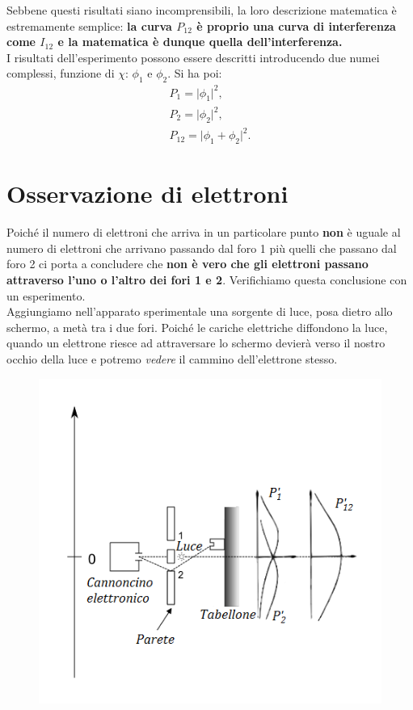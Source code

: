 Sebbene questi risultati siano incomprensibili, la loro descrizione matematica è estremamente semplice: \textbf{la curva $P_{12}$ è proprio una curva di interferenza come $I_{12}$ e la matematica è dunque quella dell'interferenza.}\\
I risultati dell'esperimento possono essere descritti introducendo due numei complessi, funzione di $\chi$: $\phi _1$ e $\phi _2$. Si ha poi:
\begin{eqnarray}
& P_1= \lvert \phi _1 \rvert ^2, & \\
& P_2= \lvert \phi _2 \rvert ^2, &\\
& P_{12}= \lvert \phi _1 + \phi _2 \rvert ^2. 
\end{eqnarray}
\section*{Osservazione di elettroni}
Poiché il numero di elettroni che arriva in un particolare punto \textbf{non} è uguale al numero di elettroni che arrivano passando dal foro 1 più quelli che passano dal foro 2 ci porta a concludere che \textbf{non è vero che gli elettroni passano attraverso l'uno o l'altro dei fori 1 e 2}. Verifichiamo questa conclusione con un esperimento.\\
Aggiungiamo nell'apparato sperimentale una sorgente di luce, posa dietro allo schermo, a metà tra i due fori. Poiché le cariche elettriche diffondono la luce, quando un elettrone riesce ad attraversare lo schermo devierà verso il nostro occhio della luce e potremo \textit{vedere} il cammino dell'elettrone stesso.
\newpage
\begin{figure}[!htbp]
\begin{center}
\includegraphics[width=.6\textwidth]{immagini/cap_2/fig_2_4.png}
\end{center}
\end{figure}
